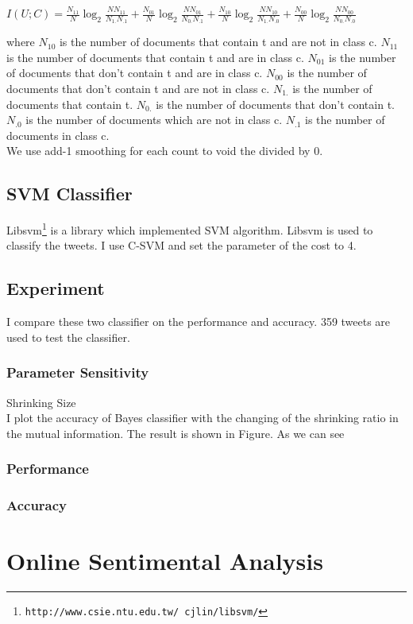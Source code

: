 \documentclass{article}
\begin{document}
\begin{center}
$I(U; C) = \frac{N_{11}}{N} \log_2 \frac{N N_{11}}{N_{1.}N_{.1}} + \frac{N_{01}}{N} \log_2 \frac{N N_{01}}{N_{0.}N_{.1}} + \frac{N_{10}}{N} \log_2 \frac{N N_{10}}{N_{1.}N_{.0}} + \frac{N_{00}}{N}\log_2 \frac{N N_{00}}{N_{0.}N_{.0}}$
\end{center}

\noindent where $N_{10}$ is the number of documents that contain t and are not in class c. $N_{11}$ is the number of documents that contain t and are in class c. $N_{01}$ is the number of documents that don't contain t and are in class c. $N_{00}$ is the number of documents that don't contain t and are not in class c. $N_{1.}$ is the number of documents that contain t. $N_{0.}$ is the number of documents that don't contain t. $N_{.0}$ is the number of documents which are not in class c. $N_{.1}$ is the number of documents in class c.\\
We use add-1 smoothing for each count to void the divided by 0.
\subsection{SVM Classifier}
Libsvm\footnote{\texttt{\scriptsize{http://www.csie.ntu.edu.tw/~cjlin/libsvm/‎‎}}} is a library which implemented SVM algorithm. Libsvm is used to classify the tweets. ‎I use C-SVM and set the parameter of the cost to 4.
\subsection{Experiment}
I compare these two classifier on the performance and accuracy. 359 tweets are used to test the classifier.
\subsubsection{Parameter Sensitivity}
Shrinking Size \\
I plot the accuracy of Bayes classifier with the changing of the shrinking ratio in the mutual information. The result is shown in Figure. As we can see 
\subsubsection{Performance}
\subsubsection{Accuracy}
\section{Online Sentimental Analysis}
\end{document}
